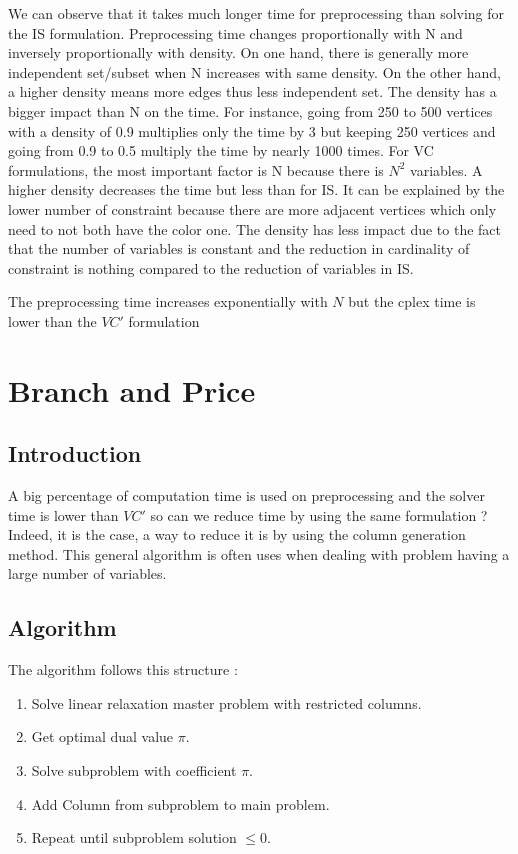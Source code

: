 We can observe that it takes much longer time for preprocessing than solving for the IS formulation. Preprocessing time changes proportionally with N and inversely proportionally with density. On one hand, there is generally more independent set/subset when N increases with same density. On the other hand, a higher density means more edges thus less independent set. The density has a bigger impact than N on the time. For instance, going from 250 to 500 vertices with a density of 0.9 multiplies only the time by 3 but keeping 250 vertices and going from 0.9 to 0.5  multiply the time by nearly 1000 times. For VC formulations, the most important factor is N because there is $N^2$ variables. A higher density decreases the time but less than for IS. It can be explained by the lower number of constraint because there are more adjacent vertices which only need to not both have the color one. The density has less impact due to the fact that the number of variables is constant and the reduction in cardinality of constraint is nothing compared to the reduction of variables in IS.

The preprocessing time increases exponentially with $N$ but the cplex time is lower than the $VC\prime$ formulation

\section{Branch and Price}
\label{sec:StableBP}
\subsection{Introduction}

A big percentage of computation time is used on preprocessing and the solver time is lower than $VC\prime$ so can we reduce time by using the same formulation ? Indeed, it is the case, a way to reduce it is by using the column generation method. This general algorithm is often uses when dealing with problem having a large number of variables. 

\subsection{Algorithm}

The algorithm follows this structure : 
\newline

\begin{enumerate}
\item Solve linear relaxation master problem with restricted columns.
\item Get optimal dual value $\pi$.
\item Solve subproblem with coefficient $\pi$.
\item Add Column from subproblem to main problem.
\item Repeat until subproblem solution $\leq 0$. 
\end{enumerate}


